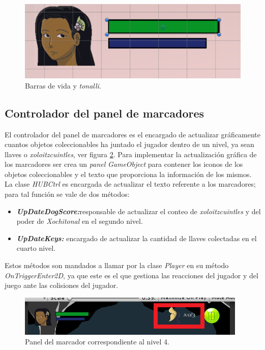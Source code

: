     \begin{figure}[h]
        \centering
        \includegraphics[height=0.1 \textheight]{03TrabajoRealizado/imagenes/attributesBar.png}
        \caption{Barras de vida y \textit{tonalli}.}
        \label{fig:HealthBar}
    \end{figure}
    
\subsection{Controlador del panel de marcadores}
El controlador del panel de marcadores es el encargado de actualizar gráficamente cuantos objetos coleccionables ha juntado el jugador dentro de un nivel, ya sean llaves o \textit{xoloitzcuintles}, ver figura \ref{fig:HUB}. Para implementar la actualización gráfica de los marcadores ser crea un \textit{panel} \textit{GameObject} para contener los iconos de los objetos coleccionables y el texto que proporciona la información de los mismos. La clase \textit{HUBCtrl} es encargada de actualizar el texto referente a los marcadores; para tal función se vale de dos métodos:

    \begin{itemize}
        \item \textit{\textbf{UpDateDogScore:}}responsable de actualizar el conteo de \textit{xoloitzcuintles} y del poder de \textit{Xochitonal} en el segundo nivel.
         \item \textit{\textbf{UpDateKeys:}} encargado de actualizar la cantidad de llaves colectadas en el cuarto nivel.
    \end{itemize}    
    
    Estos métodos son mandados a llamar por la clase \textit{Player} en su método \textit{OnTriggerEnter2D}, ya que este es el que gestiona las reacciones del jugador y del juego ante las colisiones del jugador.

    \begin{figure}[h]
        \centering
        \includegraphics[height=0.05 \textheight]{03TrabajoRealizado/imagenes/HUB.png}
        \caption{Panel del marcador correspondiente al nivel 4.}
        \label{fig:HUB}
    \end{figure}
    

